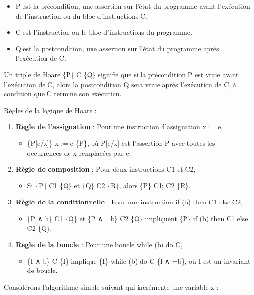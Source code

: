 \documentclass[11pt]{article}
\begin{document}
\begin{itemize}
\item P est la précondition, une assertion sur l'état du programme avant l'exécution de l'instruction ou du bloc d'instructions C.
\item C est l'instruction ou le bloc d'instructions du programme.
\item Q est la postcondition, une assertion sur l'état du programme après l'exécution de C.
\end{itemize}

Un triple de Hoare \{P\} C \{Q\} signifie que si la précondition P est vraie avant l'exécution de C, alors la postcondition Q sera vraie après l'exécution de C, à condition que C termine son exécution.

Règles  de la logique de Hoare : 
\begin{enumerate}
\item \textbf{\textbf{Règle de l'assignation}} : Pour une instruction d'assignation x := e,
\begin{itemize}
\item \{P[e/x]\} x := e \{P\}, où P[e/x] est l'assertion P avec toutes les occurrences de x remplacées par e.
\end{itemize}

\item \textbf{\textbf{Règle de composition}} : Pour deux instructions C1 et C2,
\begin{itemize}
\item Si \{P\} C1 \{Q\} et \{Q\} C2 \{R\}, alors \{P\} C1; C2 \{R\}.
\end{itemize}

\item \textbf{\textbf{Règle de la conditionnelle}} : Pour une instruction if (b) then C1 else C2,
\begin{itemize}
\item \{P ∧ b\} C1 \{Q\} et \{P ∧ ¬b\} C2 \{Q\} impliquent \{P\} if (b) then C1 else C2 \{Q\}.
\end{itemize}

\item \textbf{\textbf{Règle de la boucle}} : Pour une boucle while (b) do C,
\begin{itemize}
\item \{I ∧ b\} C \{I\} implique \{I\} while (b) do C \{I ∧ ¬b\}, où I est un invariant de boucle.
\end{itemize}
\end{enumerate}


Considérons l'algorithme simple suivant qui incrémente une variable x :
\end{document}
